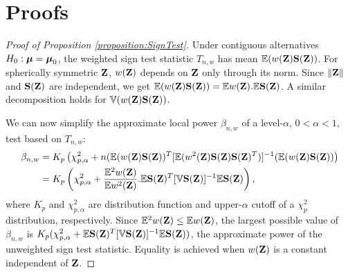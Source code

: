
\newpage
\section{Proofs}
\label{section:appC}

\begin{proof}[Proof of Proposition \ref{proposition:SignTest}]
Under contiguous alternatives $H_0: {\boldsymbol{\mu}} = {\boldsymbol{\mu}}_0$, the weighted sign test statistic $T_{n,w}$ has mean ${\mathbb{E}} (w({\mathbf{Z}}) {\mathbf{S}} ({\mathbf{Z}}))$. For spherically symmetric ${\mathbf{Z}}$, $w({\mathbf{Z}})$ depends on ${\mathbf{Z}}$ only through its norm. Since $\| {\mathbf{Z}} \|$ and ${\mathbf{S}}({\mathbf{Z}})$ are independent, we get ${\mathbb{E}} (w({\mathbf{Z}}) {\mathbf{S}} ({\mathbf{Z}})) = {\mathbb{E}} w({\mathbf{Z}}). {\mathbb{E}} {\mathbf{S}} ({\mathbf{Z}})$. A similar decomposition holds for ${\mathbb{V}} (w({\mathbf{Z}}) {\mathbf{S}}({\mathbf{Z}}))$.

We can now simplify the approximate local power $\beta_{n,w}$ of a level-$\alpha$, $0 < \alpha < 1$, test based on $T_{n,w}$:
%
\begin{align*}
\beta_{n,w} &= K_p \left( \chi^2_{p,\alpha} + n ({\mathbb{E}} (w({\mathbf{Z}}) {\mathbf{S}} ({\mathbf{Z}}))^T
[ {\mathbb{E}} (w^2({\mathbf{Z}}) {\mathbf{S}} ({\mathbf{Z}}) {\mathbf{S}} ({\mathbf{Z}})^T) ]^{-1} ({\mathbb{E}} (w({\mathbf{Z}}) {\mathbf{S}} ({\mathbf{Z}})) \right)\\
&= K_p \left( \chi^2_{p,\alpha} + \frac{{\mathbb{E}}^2 w({\mathbf{Z}})}{{\mathbb{E}} w^2({\mathbf{Z}})}. {\mathbb{E}}{\mathbf{S}}({\mathbf{Z}})^T [{\mathbb{V}} {\mathbf{S}}({\mathbf{Z}})]^{-1} {\mathbb{E}} {\mathbf{S}}({\mathbf{Z}}) \right),
\end{align*}
%
where $K_p$ and $\chi^2_{p,\alpha}$ are distribution function and upper-$\alpha$ cutoff of a $\chi^2_p$ distribution, respectively. Since ${\mathbb{E}}^2 w({\mathbf{Z}}) \leq {\mathbb{E}} w({\mathbf{Z}})$, the largest possible value of $\beta_{n,w}$ is $K_p ( \chi^2_{p,\alpha} + {\mathbb{E}} {\mathbf{S}}({\mathbf{Z}})^T [{\mathbb{V}} {\mathbf{S}}({\mathbf{Z}})]^{-1} {\mathbb{E}} {\mathbf{S}}({\mathbf{Z}}) )$, the approximate power of the unweighted sign test statistic. Equality is achieved when $w({\mathbf{Z}})$ is a constant independent of ${\mathbf{Z}}$.
\end{proof}

